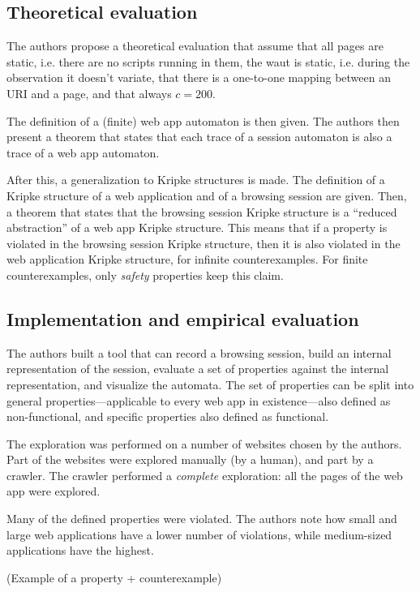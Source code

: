 \documentclass[a4paper,10pt]{article}
\theoremstyle{plain} %
\theoremstyle{definition}
\theoremstyle{remark}
\begin{document}
\subsection{Theoretical evaluation}

The authors propose a theoretical evaluation that assume that all pages are static, i.e. there are no scripts running in them, the \gls{waut} is static, i.e. during the observation it doesn't variate, that there is a one-to-one mapping between an URI and a page, and that always $c = 200$.

The definition of a (finite) web app automaton is then given. The authors then present a theorem that states that each trace of a session automaton is also a trace of a web app automaton.

After this, a generalization to Kripke structures is made. The definition of a Kripke structure of a web application and of a browsing session are given. Then, a theorem that states that the browsing session Kripke structure is a ``reduced abstraction'' of a web app Kripke structure. This means that if a property is violated in the browsing session Kripke structure, then it is also violated in the web application Kripke structure, for infinite counterexamples. For finite counterexamples, only \textit{safety} properties keep this claim.

\subsection{Implementation and empirical evaluation}

The authors built a tool that can record a browsing session, build an internal representation of the session, evaluate a set of properties against the internal representation, and visualize the automata. The set of properties can be split into general properties---applicable to every web app in existence---also defined as non-functional, and specific properties also defined as functional.

The exploration was performed on a number of websites chosen by the authors. Part of the websites were explored manually (by a human), and part by a crawler. The crawler performed a \emph{complete} exploration: all the pages of the web app were explored. 

Many of the defined properties were violated. The authors note how small and large web applications have a lower number of violations, while medium-sized applications have the highest.

(Example of a property + counterexample)
\end{document}
